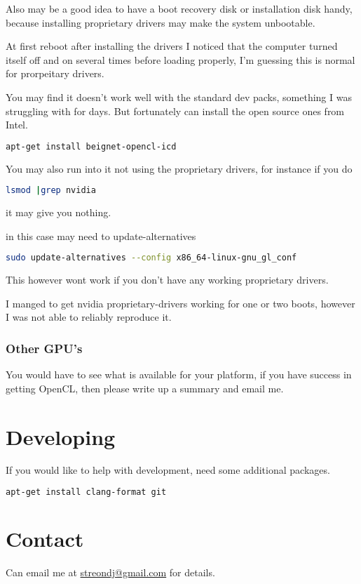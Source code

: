 \documentclass[12pt]{report}
\begin{document}
Also may be a good idea to have a boot recovery disk or installation disk handy,
because installing proprietary drivers may make the system unbootable. 


At first reboot after installing the drivers I noticed that the computer turned
itself off and on several times before loading properly, I'm guessing this is
normal for prorpeitary drivers. 

You may find it doesn't work well with the standard dev packs, something I was
struggling with for days.  But fortunately can install the open source ones 
from Intel.

\begin{lstlisting}[language=bash]
apt-get install beignet-opencl-icd
\end{lstlisting}


You may also run into it not using the proprietary drivers, 
for instance if you do 
\begin{lstlisting}[language=bash]
lsmod |grep nvidia
\end{lstlisting}
it may give you nothing. 

in this case may need to update-alternatives
\begin{lstlisting}[language=bash]
sudo update-alternatives --config x86_64-linux-gnu_gl_conf
\end{lstlisting}

This however wont work if you don't have any working proprietary drivers. 

I manged to get nvidia proprietary-drivers working for one or two boots, however
I was not able to reliably reproduce it.

\subsubsection{Other GPU's}
You would have to see what is available for your platform,
if you have success in getting OpenCL, then please write up a summary and email
me.

\section{Developing}

If you would like to help with development, need some additional packages.
\begin{lstlisting}[language=bash]
apt-get install clang-format git
\end{lstlisting}

\section{Contact}
Can email me at \href{mailto:streondj@gmail.com}{streondj@gmail.com}
for details.
\printbibliography
\end{document}
